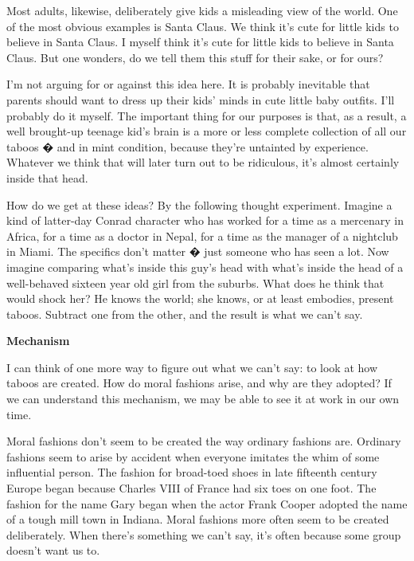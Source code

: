 Most
                  adults, likewise, deliberately give kids a misleading view of
                  the world. One of the most obvious examples is Santa Claus. We
                  think it's cute for little kids to believe in Santa Claus. I
                  myself think it's cute for little kids to believe in Santa
                  Claus. But one wonders, do we tell them this stuff for their
                  sake, or for ours?

I'm not arguing for or against
                  this idea here. It is probably inevitable that parents should
                  want to dress up their kids' minds in cute little baby
                  outfits. I'll probably do it myself. The important thing for
                  our purposes is that, as a result, a well brought-up teenage
                  kid's brain is a more or less complete collection of all our
                  taboos � and in mint condition, because they're untainted by
                  experience. Whatever we think that will later turn out to be
                  ridiculous, it's almost certainly inside that head.

How
                  do we get at these ideas? By the following thought experiment.
                  Imagine a kind of latter-day Conrad character who has worked
                  for a time as a mercenary in Africa, for a time as a doctor in
                  Nepal, for a time as the manager of a nightclub in Miami. The
                  specifics don't matter � just someone who has seen a lot. Now
                  imagine comparing what's inside this guy's head with what's
                  inside the head of a well-behaved sixteen year old girl from
                  the suburbs. What does he think that would shock her? He knows
                  the world; she knows, or at least embodies, present taboos.
                  Subtract one from the other, and the result is what we can't
                  say.
                  

\textbf{Mechanism}

I can think of one more way to figure out what we
                  can't say: to look at how taboos are created. How do moral
                  fashions arise, and why are they adopted? If we can understand
                  this mechanism, we may be able to see it at work in our own
                  time.

Moral fashions don't seem to be created the
                  way ordinary fashions are. Ordinary fashions seem to arise by
                  accident when everyone imitates the whim of some influential
                  person. The fashion for broad-toed shoes in late fifteenth
                  century Europe began because Charles VIII of France had six
                  toes on one foot. The fashion for the name Gary began when the
                  actor Frank Cooper adopted the name of a tough mill town in
                  Indiana. Moral fashions more often seem to be created
                  deliberately. When there's something we can't say, it's often
                  because some group doesn't want us to.

